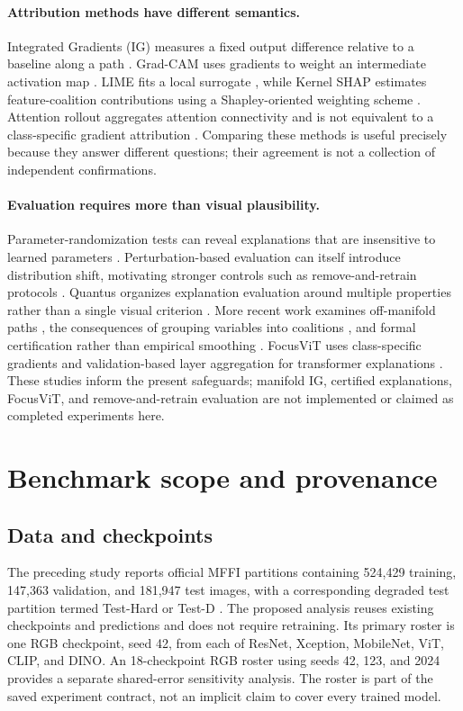 \documentclass{article}
\begin{document}
\paragraph{Attribution methods have different semantics.}
Integrated Gradients (IG) measures a fixed output difference relative to a baseline along a path \citep{sundararajan2017}. Grad-CAM uses gradients to weight an intermediate activation map \citep{selvaraju2017}. LIME fits a local surrogate \citep{ribeiro2016}, while Kernel SHAP estimates feature-coalition contributions using a Shapley-oriented weighting scheme \citep{lundberg2017}. Attention rollout aggregates attention connectivity and is not equivalent to a class-specific gradient attribution \citep{abnar2020}. Comparing these methods is useful precisely because they answer different questions; their agreement is not a collection of independent confirmations.

\paragraph{Evaluation requires more than visual plausibility.}
Parameter-randomization tests can reveal explanations that are insensitive to learned parameters \citep{adebayo2018}. Perturbation-based evaluation can itself introduce distribution shift, motivating stronger controls such as remove-and-retrain protocols \citep{hooker2019}. Quantus organizes explanation evaluation around multiple properties rather than a single visual criterion \citep{hedstrom2023}. More recent work examines off-manifold paths \citep{zaher2024}, the consequences of grouping variables into coalitions \citep{zheng2025}, and formal certification rather than empirical smoothing \citep{anani2025}. FocusViT uses class-specific gradients and validation-based layer aggregation for transformer explanations \citep{ali2026}. These studies inform the present safeguards; manifold IG, certified explanations, FocusViT, and remove-and-retrain evaluation are not implemented or claimed as completed experiments here.

\section{Benchmark scope and provenance}
\subsection{Data and checkpoints}
The preceding study reports official MFFI partitions containing 524,429 training, 147,363 validation, and 181,947 test images, with a corresponding degraded test partition termed Test-Hard or Test-D \citep{cunha2026}. The proposed analysis reuses existing checkpoints and predictions and does not require retraining. Its primary roster is one RGB checkpoint, seed 42, from each of ResNet, Xception, MobileNet, ViT, CLIP, and DINO. An 18-checkpoint RGB roster using seeds 42, 123, and 2024 provides a separate shared-error sensitivity analysis. The roster is part of the saved experiment contract, not an implicit claim to cover every trained model.
\end{document}
